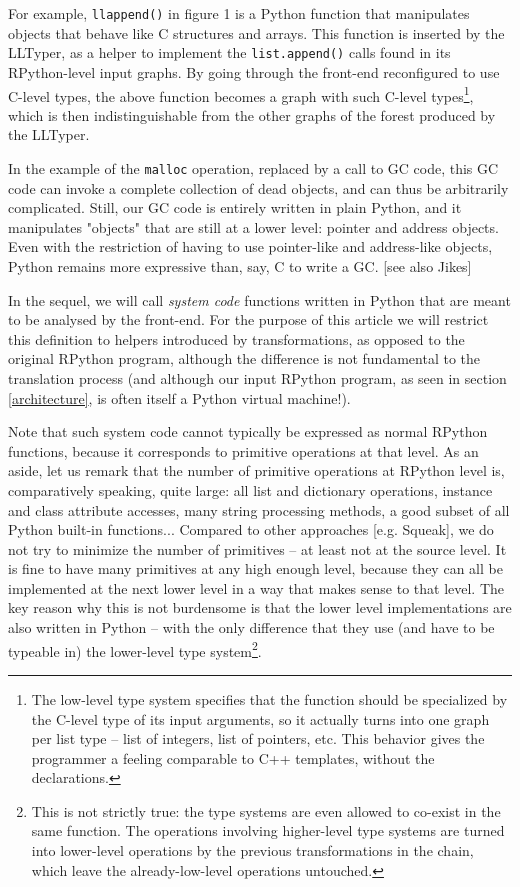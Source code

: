 \documentclass{acm_proc_article-sp}
\begin{document}
For example, \texttt{ll\textunderscore{}append()} in figure 1 is a Python function
that manipulates objects that behave like C structures and arrays.
This function is inserted by the LLTyper, as a helper to implement the
\texttt{list.append()} calls found in its RPython-level input graphs.
By going through the front-end reconfigured to use C-level types, the
above function becomes a graph with such C-level types\footnote{The
low-level type system specifies that the function should be
specialized by the C-level type of its input arguments, so it actually
turns into one graph per list type -- list of integers, list of
pointers, etc.  This behavior gives the programmer a feeling
comparable to C++ templates, without the declarations.}, which is then
indistinguishable from the other graphs of the forest produced by the
LLTyper.

In the example of the \texttt{malloc} operation, replaced by a call to GC
code, this GC code can invoke a complete collection of dead objects, and
can thus be arbitrarily complicated.  Still, our GC code is entirely
written in plain Python, and it manipulates "objects" that are still at
a lower level: pointer and address objects.  Even with the restriction
of having to use pointer-like and address-like objects, Python remains
more expressive than, say, C to write a GC.  [see also Jikes]

In the sequel, we will call \textit{system code} functions written in
Python that are meant to be analysed by the front-end.  For the
purpose of this article we will restrict this definition to helpers
introduced by transformations, as opposed to the original RPython
program, although the difference is not fundamental to the translation
process (and although our input RPython program, as seen in section
\ref{architecture}, is often itself a Python virtual machine!).

Note that such system code cannot typically be expressed as normal
RPython functions, because it corresponds to primitive operations at
that level.  As an aside, let us remark that the number of primitive
operations at RPython level is, comparatively speaking, quite large:
all list and dictionary operations, instance and class attribute
accesses, many string processing methods, a good subset of all Python
built-in functions...  Compared to other approaches [e.g. Squeak], we
do not try to minimize the number of primitives -- at least not at the
source level.  It is fine to have many primitives at any high enough
level, because they can all be implemented at the next lower level in
a way that makes sense to that level.  The key reason why this is not
burdensome is that the lower level implementations are also written in
Python -- with the only difference that they use (and have to be
typeable in) the lower-level type system\footnote{This is not strictly
true: the type systems are even allowed to co-exist in the same
function.  The operations involving higher-level type systems are
turned into lower-level operations by the previous transformations in
the chain, which leave the already-low-level operations untouched.}.
\end{document}
